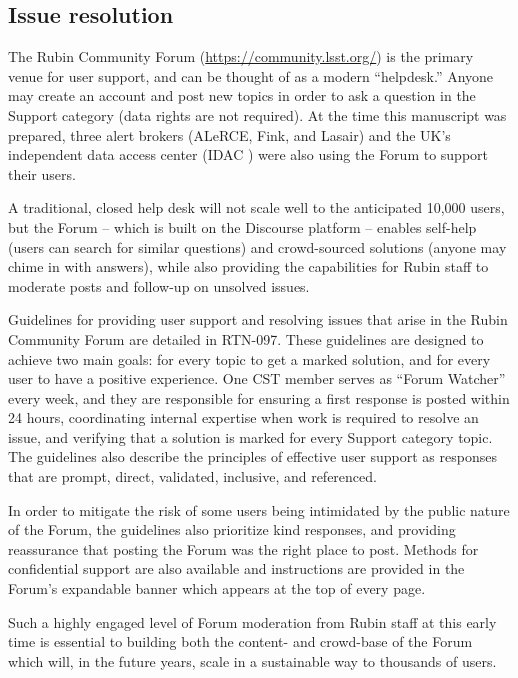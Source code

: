 \subsection{Issue resolution}\label{sec:issue_resolution}

The Rubin Community Forum (\url{https://community.lsst.org/}) is the primary venue for user support, and can be thought of as a modern ``helpdesk.''
Anyone may create an account and post new topics in order to ask a question in the Support category (data rights are not required).
At the time this manuscript was prepared, three alert brokers (ALeRCE, Fink, and Lasair) and the UK's independent data access center (IDAC \cite{RTN-003}) were also using the Forum to support their users.

A traditional, closed help desk will not scale well to the anticipated 10,000 users, but the Forum -- which is built on the Discourse platform -- enables self-help (users can search for similar questions) and crowd-sourced solutions (anyone may chime in with answers), while also providing the capabilities for Rubin staff to moderate posts and follow-up on unsolved issues.

Guidelines for providing user support and resolving issues that arise in the Rubin Community Forum are detailed in RTN-097\cite{RTN-097}.
These guidelines are designed to achieve two main goals: for every topic to get a marked solution, and for every user to have a positive experience.
One CST member serves as ``Forum Watcher'' every week, and they are responsible for ensuring a first response is posted within 24 hours, coordinating internal expertise when work is required to resolve an issue, and verifying that a solution is marked for every Support category topic.
The guidelines also describe the principles of effective user support as responses that are prompt, direct, validated, inclusive, and referenced.

In order to mitigate the risk of some users being intimidated by the public nature of the Forum, the guidelines also prioritize kind responses, and providing reassurance that posting the Forum was the right place to post.
Methods for confidential support are also available and instructions are provided in the Forum's expandable banner which appears at the top of every page.

Such a highly engaged level of Forum moderation from Rubin staff at this early time is essential to building both the content- and crowd-base of the Forum which will, in the future years, scale in a sustainable way to thousands of users.



